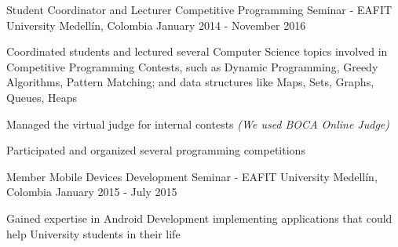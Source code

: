 \begin{cventries}
  \cventry
    {Student Coordinator and Lecturer}
    {Competitive Programming Seminar - EAFIT University}
    {Medellín, Colombia}
    {January 2014 - November 2016}
    {
      \begin{cvitems}
        \item {Coordinated students and lectured several Computer Science topics involved in
               Competitive Programming Contests, such as Dynamic Programming, Greedy Algorithms,
               Pattern Matching; and data structures like Maps, Sets, Graphs, Queues, Heaps}
        \item {Managed the virtual judge for internal contests \textit{(We used BOCA Online Judge)}}
        \item {Participated and organized several programming competitions}
      \end{cvitems}
    }
  \cventry
    {Member}
    {Mobile Devices Development Seminar - EAFIT University}
    {Medellín, Colombia}
    {January 2015 - July 2015}
    {
      \begin{cvitems}
        \item {Gained expertise in Android Development implementing applications that could help
               University students in their life}
      \end{cvitems}
    }
\end{cventries}
